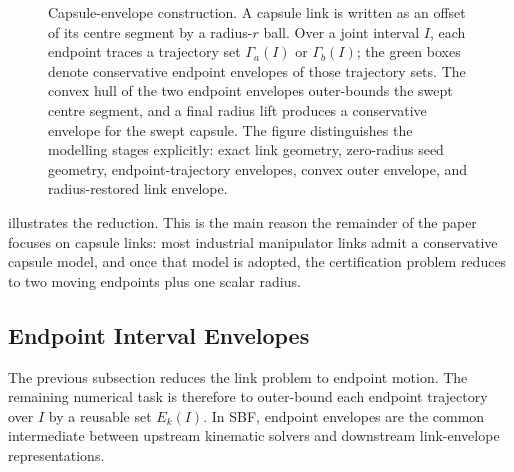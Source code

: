 \documentclass[journal]{IEEEtran}
\newcommand{\sbf}{\textsc{SBF}}
\begin{document}
\begin{figure}[t]
{
  }
  \caption{Capsule-envelope construction. A capsule link is written as an
  offset of its centre segment by a radius-$r$ ball. Over a joint interval
  $I$, each endpoint traces a trajectory set $\Gamma_a(I)$ or $\Gamma_b(I)$;
  the green boxes denote conservative endpoint envelopes of those trajectory
  sets. The convex hull of the two endpoint envelopes outer-bounds the swept
  centre segment, and a final radius lift produces a conservative envelope for
  the swept capsule. The figure distinguishes the modelling stages explicitly:
  exact link geometry, zero-radius seed geometry, endpoint-trajectory
  envelopes, convex outer envelope, and radius-restored link envelope.}
  \label{fig:capsule_envelope}
\end{figure}

 illustrates the reduction. This is the main reason
the remainder of the paper focuses on capsule links: most industrial manipulator
links admit a conservative capsule model, and once that model is adopted, the
certification problem reduces to two moving endpoints plus one scalar radius.

\subsection{Endpoint Interval Envelopes}\label{sec:rewrite_endpoint_env}

The previous subsection reduces the link problem to endpoint motion. The
remaining numerical task is therefore to outer-bound each endpoint trajectory
over $I$ by a reusable set $E_k(I)$. In \sbf{}, endpoint envelopes are the
common intermediate between upstream kinematic solvers and downstream
link-envelope representations.
\end{document}
